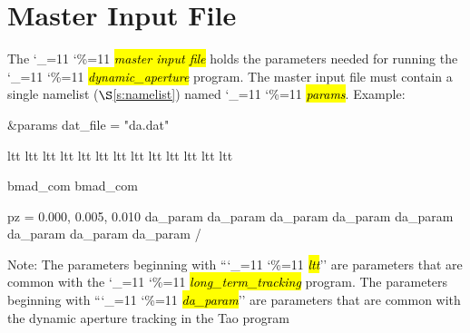 \documentclass{hitec}
\newcommand\dottcmd[1]{\hl{\em#1}\endgroup}
\newcommand{\vn}{\begingroup\catcode`\_=11 \catcode`\%=11 \dottcmd}
\newcommand{\da}{\vn{dynamic_aperture}\xspace}
\newcommand{\sref}[1]{$\S$\ref{#1}}
\newcommand{\ltt}{\vn{long_term_tracking}\xspace}
\newcommand{\Section}[1]{\section{#1}\vspace*{-1ex}}
\begin{document}
\Section{Master Input File}
\label{s:input}

The \vn{master input file} holds the parameters needed for running the \da program. The master input
file must contain a single namelist (\sref{s:namelist}) named \vn{params}.  Example:
\begin{code}
&params
  dat_file = "da.dat"

  ltt%
  ltt%
  ltt%
  ltt%
  ltt%
  ltt%
  ltt%
  ltt%
  ltt%
  ltt%
  ltt%
  ltt%
  ltt%

  bmad_com%
  bmad_com%

  pz = 0.000, 0.005, 0.010
  da_param%
  da_param%
  da_param%
  da_param%
  da_param%
  da_param%
  da_param%
  da_param%
/
\end{code}
Note: The parameters beginning with ``\vn{ltt}'' are parameters that are common with the
\ltt program. The parameters beginning with ``\vn{da_param}'' are parameters
that are common with the dynamic aperture tracking in the Tao program
\end{document}
